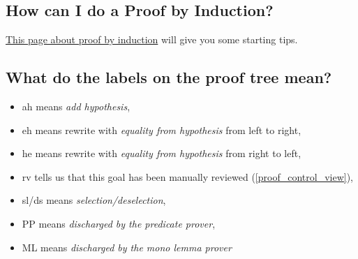 \subsection{How can I do a Proof by Induction?}
\href{https://wiki.event-b.org/index.php/Induction_proof}{This page about proof by induction} will give you some starting tips.

\subsection{What do the labels on the proof tree mean?}

\begin{itemize}
	\item \textsf{ah} means \textit{add hypothesis},
	\item \textsf{eh} means rewrite with \textit{equality from hypothesis} from left to right,
	\item \textsf{he} means rewrite with \textit{equality from hypothesis} from right to left,
	\item \textsf{rv} tells us that this goal has been manually reviewed (\ref{proof_control_view}),
	\item \textsf{sl/ds} means \textit{selection/deselection},
	\item \textsf{PP} means \textit{discharged by the predicate prover},
	\item \textsf{ML} means \textit{discharged by the mono lemma prover}
\end{itemize}

